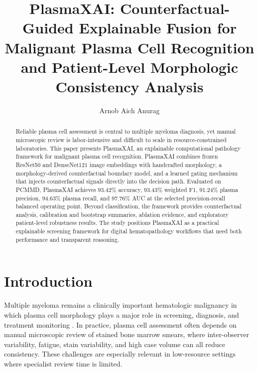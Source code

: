 \documentclass[runningheads]{llncs}
\begin{document}
\title{PlasmaXAI: Counterfactual-Guided Explainable Fusion for Malignant Plasma Cell Recognition and Patient-Level Morphologic Consistency Analysis}
\author{Arnob Aich Anurag}

\maketitle
\thispagestyle{plain}

\begin{abstract}
Reliable plasma cell assessment is central to multiple myeloma diagnosis, yet manual microscopic review is labor-intensive and difficult to scale in resource-constrained laboratories. This paper presents PlasmaXAI, an explainable computational pathology framework for malignant plasma cell recognition. PlasmaXAI combines frozen ResNet50 and DenseNet121 image embeddings with handcrafted morphology, a morphology-derived counterfactual boundary model, and a learned gating mechanism that injects counterfactual signals directly into the decision path. Evaluated on PCMMD, PlasmaXAI achieves 93.42\% accuracy, 93.43\% weighted F1, 91.24\% plasma precision, 94.63\% plasma recall, and 97.76\% AUC at the selected precision-recall balanced operating point. Beyond classification, the framework provides counterfactual analysis, calibration and bootstrap summaries, ablation evidence, and exploratory patient-level robustness results. The study positions PlasmaXAI as a practical explainable screening framework for digital hematopathology workflows that need both performance and transparent reasoning.
\end{abstract}

\section{Introduction}
Multiple myeloma remains a clinically important hematologic malignancy in which plasma cell morphology plays a major role in screening, diagnosis, and treatment monitoring \cite{mmreview}. In practice, plasma cell assessment often depends on manual microscopic review of stained bone marrow smears, where inter-observer variability, fatigue, stain variability, and high case volume can all reduce consistency. These challenges are especially relevant in low-resource settings where specialist review time is limited.
\end{document}
